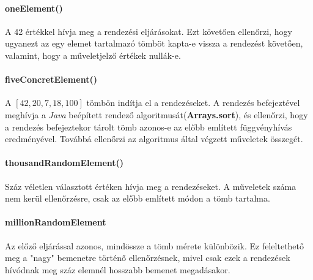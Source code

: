 \documentclass{elteikthesis}
\begin{document}
\paragraph{oneElement()}
A 42 értékkel hívja meg a rendezési eljárásokat. Ezt követően ellenőrzi, hogy ugyanezt az egy elemet tartalmazó tömböt kapta-e vissza a rendezést követően, valamint, hogy a műveletjelző értékek nullák-e.
\paragraph{fiveConcretElement()}
A  $[42, 20, 7, 18, 100]$ tömbön indítja el a rendezéseket. A rendezés befejeztével meghívja a \emph{Java} beépített rendező algoritmusát(\textbf{Arrays.sort}), és ellenőrzi, hogy a rendezés befejeztekor tárolt tömb azonos-e az előbb említett függvényhívás eredményével. Továbbá ellenőrzi az algoritmus által végzett műveletek összegét.
\paragraph{thousandRandomElement()}
Száz véletlen választott értéken hívja meg a rendezéseket. A műveletek száma nem kerül ellenőrzésre, csak az előbb említett módon a tömb tartalma.
\paragraph{millionRandomElement}
Az előző eljárással azonos, mindössze a tömb mérete különbözik. Ez feleltethető meg a "nagy" bemenetre történő ellenőrzésnek, mivel csak ezek a rendezések hívódnak meg száz elemnél hosszabb bemenet megadásakor.
\end{document}
